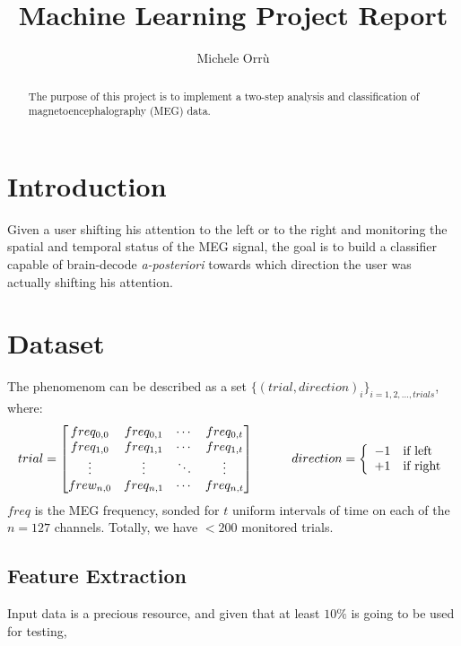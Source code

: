 \documentclass[10pt]{article}
\title{\textbf{Machine Learning Project Report }}
\author{Michele Orr\`u}
\begin{document}
\maketitle

\begin{abstract}
The purpose of this project is to implement a two-step analysis and classification of magnetoencephalography (MEG) data. 
\end{abstract}



\section{Introduction}
Given a user shifting his attention to the left or to the right and monitoring the spatial and temporal status of the MEG signal, the goal is to build a classifier capable of brain-decode \textit{a-posteriori} towards which direction the user was actually shifting his attention.



\section{Dataset}
The phenomenom can be described as a set $\{(trial, direction)_i\}_{i= 1, 2, \dots, trials}$, where:
$$
trial  = 
 \begin{bmatrix}
   freq_{0, 0} & freq_{0, 1} & \cdots & freq_{0, t}  \\
   freq_{1, 0} & freq_{1, 1} & \cdots & freq_{1, t}  \\
   \vdots      & \vdots      & \ddots & \vdots       \\
   frew_{n, 0} & freq_{n, 1} & \cdots & freq_{n, t} 
 \end{bmatrix}
\hspace{30pt}
 direction = \left\{
 \begin{array}{l l}
   -1 & \text{if left}\\
   +1 & \text{if right}\\
 \end{array}\right .
$$
$freq$ is the MEG frequency, sonded for $t$ uniform intervals of time on each of the $n = 127$ channels.
Totally, we have $< 200$ monitored trials.

\subsection{Feature Extraction}
Input data is a precious resource, and given that at least $10\%$ is going to be used for testing, 
\end{document}
